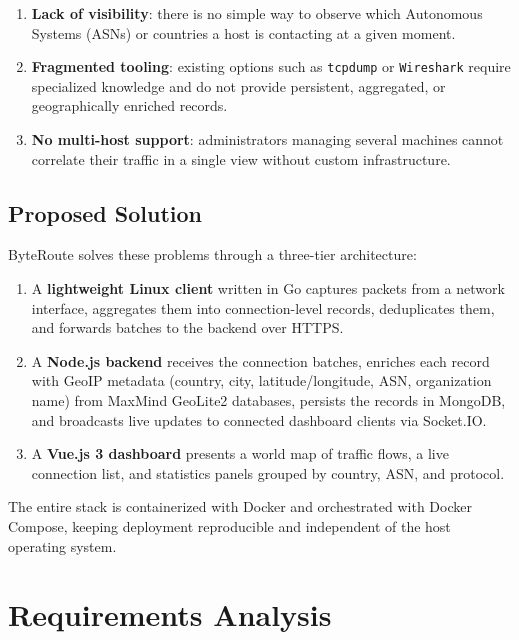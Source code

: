 \documentclass[12pt]{report}
\begin{document}
\begin{enumerate}
  \item \textbf{Lack of visibility}: there is no simple way to observe which
    Autonomous Systems (ASNs) or countries a host is contacting at a given
    moment.
  \item \textbf{Fragmented tooling}: existing options such as \texttt{tcpdump}
    or \texttt{Wireshark} require specialized knowledge and do not provide
    persistent, aggregated, or geographically enriched records.
  \item \textbf{No multi-host support}: administrators managing several machines
    cannot correlate their traffic in a single view without custom
    infrastructure.
\end{enumerate}

\newpage
\section{Proposed Solution}

ByteRoute solves these problems through a three-tier architecture:

\begin{enumerate}
  \item A \textbf{lightweight Linux client} written in Go captures packets from
    a network interface, aggregates them into connection-level records,
    deduplicates them, and forwards batches to the backend over HTTPS.
  \item A \textbf{Node.js backend} receives the connection batches, enriches
    each record with GeoIP metadata (country, city, latitude/longitude, ASN,
    organization name) from MaxMind GeoLite2 databases, persists the records in
    MongoDB, and broadcasts live updates to connected dashboard clients via
    Socket.IO.
  \item A \textbf{Vue.js 3 dashboard} presents a world map of traffic flows, a
    live connection list, and statistics panels grouped by country, ASN, and
    protocol.
\end{enumerate}

The entire stack is containerized with Docker and orchestrated with Docker
Compose, keeping deployment reproducible and independent of the host
operating system.

\chapter{Requirements Analysis}
\label{chap:requirements}
\end{document}
